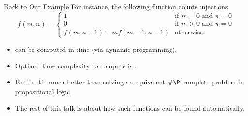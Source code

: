 \documentclass{beamer}
\begin{document}
\begin{frame}{Back to Our Example}
  For instance, the following function counts injections
  \[
  f(m, n) =
  \begin{cases}
    1 & \text{if } m = 0 \text{ and } n = 0 \\
    0 & \text{if } m > 0 \text{ and } n = 0 \\
    f(m, n-1) + mf(m-1, n-1) & \text{otherwise.}
  \end{cases}
  \]
  \pause
  \begin{itemize}
  \item {} can be computed in  time (via dynamic programming).
  \item Optimal time complexity to compute  is .
  \item But  is still much better than solving an equivalent \alert{$\#\P$-complete} problem in propositional logic.
  \item The rest of this talk is about how such functions can be found automatically.
  \end{itemize}
\end{frame}
\end{document}
